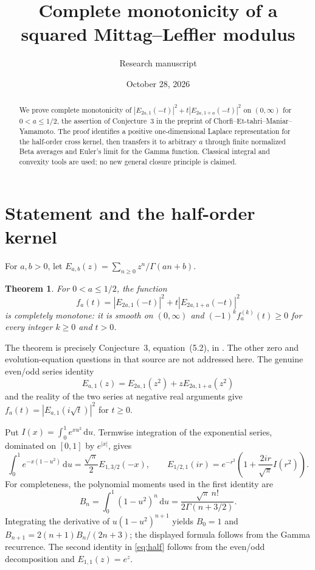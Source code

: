 \documentclass[11pt]{article}
\title{Complete monotonicity of a squared Mittag--Leffler modulus}
\author{Research manuscript}
\date{October 28, 2026}
\newtheorem{theorem}{Theorem}
\newcommand{\dd}{\,\mathrm{d}}
\begin{document}
\maketitle
\begin{abstract}
We prove complete monotonicity of
$|E_{2a,1}(-t)|^2+t|E_{2a,1+a}(-t)|^2$ on $(0,\infty)$ for
$0<a\leq1/2$, the assertion of Conjecture~3 in the preprint of
Chorfi--Et-tahri--Maniar--Yamamoto. The proof identifies a positive
one-dimensional Laplace representation for the half-order cross kernel,
then transfers it to arbitrary $a$ through finite normalized Beta averages
and Euler's limit for the Gamma function. Classical integral and convexity
tools are used; no new general closure principle is claimed.
\end{abstract}

\section{Statement and the half-order kernel}
For $a,b>0$, let $E_{a,b}(z)=\sum_{n\geq0}z^n/\Gamma(an+b)$.
\begin{theorem}\label{thm:main}
For $0<a\leq1/2$, the function
\[
 f_a(t)=|E_{2a,1}(-t)|^2+t|E_{2a,1+a}(-t)|^2
\]
is completely monotone: it is smooth on $(0,\infty)$ and
$(-1)^k f_a^{(k)}(t)\geq0$ for every integer $k\geq0$ and $t>0$.
\end{theorem}
The theorem is precisely Conjecture~3, equation~(5.2), in
\cite[Section~5]{CEMY}. The other zero and evolution-equation questions
in that source are not addressed here. The genuine even/odd series identity
\[
 E_{a,1}(z)=E_{2a,1}(z^2)+zE_{2a,1+a}(z^2)
\]
and the reality of the two series at negative real arguments give
$f_a(t)=|E_{a,1}(i\sqrt t)|^2$ for $t\geq0$.

Put $I(x)=\int_0^1e^{xu^2}\dd u$. Termwise integration of the exponential
series, dominated on $[0,1]$ by $e^{|x|}$, gives
\begin{equation}\label{eq:half}
 \int_0^1e^{-x(1-u^2)}\dd u
 =\frac{\sqrt\pi}{2}E_{1,3/2}(-x),\qquad
 E_{1/2,1}(ir)=e^{-r^2}\left(1+\frac{2ir}{\sqrt\pi}I(r^2)\right).
\end{equation}
For completeness, the polynomial moments used in the first identity are
\[
 B_n=\int_0^1(1-u^2)^n\dd u
 =\frac{\sqrt\pi\,n!}{2\Gamma(n+3/2)}.
\]
Integrating the derivative of $u(1-u^2)^{n+1}$ yields
$B_0=1$ and $B_{n+1}=2(n+1)B_n/(2n+3)$; the displayed formula follows
from the Gamma recurrence. The second identity in \eqref{eq:half} follows
from the even/odd decomposition and $E_{1,1}(z)=e^z$.
\end{document}
